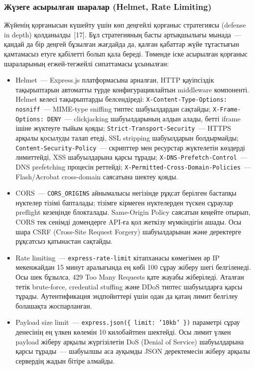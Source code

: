 \documentclass[14pt,a4paper]{extarticle}
\begin{document}
\subsubsection{Жүзеге асырылған шаралар (Helmet, Rate Limiting)}

Жүйенің қорғанысын күшейту үшін көп деңгейлі қорғаныс стратегиясы (defense in depth) қолданылды~[17]. Бұл стратегияның басты артықшылығы мынада~--- қандай да бір деңгей бұзылған жағдайда да, қалған қабаттар жүйе тұтастығын қамтамасыз етуге қабілетті болып қала береді. Төменде іске асырылған қорғаныс шараларының егжей-тегжейлі сипаттамасы ұсынылған:

\begin{itemize}[nosep]
\item Helmet~--- Express.js платформасына арналған, HTTP қауіпсіздік тақырыптарын автоматты түрде конфигурациялайтын middleware компоненті. Helmet келесі тақырыптарды белсендіреді: \texttt{X-Content-Type-Options: nosniff}~--- MIME-type sniffing типтес шабуылдардан сақтайды; \texttt{X-Frame-Options: DENY}~--- clickjacking шабуылдарының алдын алады, бетті iframe ішіне жүктеуге тыйым қояды; \texttt{Strict-Transport-Security}~--- HTTPS арқылы қосылуды талап етеді, SSL stripping шабуылдарын болдырмайды; \texttt{Content-Security-Policy}~--- скрипттер мен ресурстар жүктелетін көздерді лимиттейді, XSS шабуылдарына қарсы тұрады; \texttt{X-DNS-Prefetch-Control}~--- DNS prefetching процесін реттейді; \texttt{X-Permitted-Cross-Domain-Policies}~--- Flash/Acrobat cross-domain саясатына шектеу қояды.
\item CORS~--- \texttt{CORS\_ORIGINS} айнымалысы негізінде рұқсат берілген бастапқы нүктелер тізімі бапталады; тізімге кірмеген нүктелерден түскен сұраулар preflight кезеңінде блокталады. Same-Origin Policy саясатын кеңейте отырып, CORS тек сенімді домендерге API-ға қол жеткізу мүмкіндігін ашады. Осы шара CSRF (Cross-Site Request Forgery) шабуылдарынан және деректерге рұқсатсыз қатынастан сақтайды.
\item Rate limiting~--- \texttt{express-rate-limit} кітапханасы көмегімен әр IP мекенжайдан 15 минут аралығында ең көбі 100 сұрау жіберу шегі белгіленеді. Осы шек бұзылса, 429 Too Many Requests қате жауабы жіберіледі. Аталған тетік brute-force, credential stuffing және DDoS типтес шабуылдарға қарсы тұрады. Аутентификация эндпойнттері үшін одан да қатаң лимит белгілеу болашақта жоспарланған.
\item Payload size limit~--- \texttt{express.json(\{ limit: '10kb' \})} параметрі сұрау денесінің ең үлкен көлемін 10 килобайтпен шектейді. Осы лимит үлкен payload жіберу арқылы жүргізілетін DoS (Denial of Service) шабуылдарына қарсы тұрады~--- шабуылшы аса ауқымды JSON деректемесін жіберу арқылы сервердің жадын бітіре алмайды.

\end{itemize}
\end{document}
